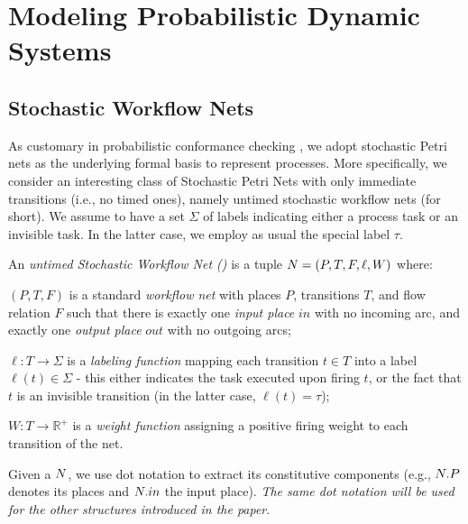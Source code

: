 
 
\section{Modeling Probabilistic Dynamic Systems}
\subsection{Stochastic Workflow Nets}\label{subsec:spn}
As customary in probabilistic conformance checking \cite{lavori-su-prob-conformance}, we adopt stochastic Petri nets \cite{MarsanCB84,Desel1998,RoggeSoltiAW13} as the underlying formal basis to represent processes. More specifically, we consider an interesting class of Stochastic Petri Nets with only immediate transitions (i.e., no timed ones), namely untimed stochastic workflow nets (\uswn for short). 
We assume to have a set $\Sigma$ of labels indicating either a process task or an invisible task. In the latter case, we employ as usual the special label $\tau$.

\begin{definition} An \emph{untimed Stochastic Workflow Net (\uswn)}
is a tuple $N = (P,T,F,\ell,W)$ where:
\begin{compactitem}
\item $(P,T,F)$ is a standard \emph{workflow net} with places $P$, transitions $T$, and flow relation $F$ such that there is exactly one \emph{input place} $in$ with no incoming arc, and exactly one \emph{output place} $out$ with no outgoing arcs;
\item $\ell: T \rightarrow \Sigma$ is a \emph{labeling function} mapping each transition $t \in T$ into a label $\ell(t) \in \Sigma$ - this either indicates the task executed upon firing $t$, or the fact that $t$ is an invisible transition (in the latter case, $\ell(t) = \tau$);
\item $W\colon T\to \mathbb{R}^+$ is a \emph{weight function} assigning a positive firing weight to each transition of the net.
\end{compactitem}
\end{definition}
Given a \uswn $N$, we use dot notation to extract its constitutive components (e.g., $N.P$ denotes its places and $N.in$ the input place). \emph{The same dot notation will be used for the other structures introduced in the paper}.


